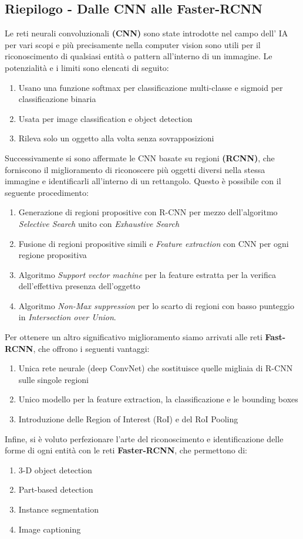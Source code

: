 \subsection*{Riepilogo - Dalle CNN alle Faster-RCNN}
Le reti neurali convoluzionali \textbf{(CNN)} sono state introdotte nel campo dell' IA per vari scopi e più precisamente nella computer vision sono utili per il riconoscimento di qualsiasi entità o pattern all'interno di un immagine. Le potenzialità e i limiti sono elencati di seguito:
\begin{enumerate}
\item Usano una funzione softmax per classificazione multi-classe e sigmoid per classificazione binaria
\item Usata per image classification e object detection
\item Rileva solo un oggetto alla volta senza sovrapposizioni
\end{enumerate}
Successivamente si sono affermate le CNN basate su regioni \textbf{(RCNN)}, che forniscono il miglioramento di riconoscere più oggetti diversi nella stessa immagine e identificarli all'interno di un rettangolo. Questo è possibile con il seguente procedimento:
\begin{enumerate}
\item Generazione di regioni propositive con R-CNN per mezzo dell'algoritmo \emph{Selective Search} unito con \emph{Exhaustive Search}
\item Fusione di regioni propositive simili e \emph{Feature extraction} con CNN per ogni regione propositiva
\item Algoritmo \emph{Support vector machine} per la feature estratta per la verifica dell'effettiva presenza dell'oggetto 
\item Algoritmo \emph{Non-Max suppression} per lo scarto di regioni con basso punteggio in \emph{Intersection over Union}.
\end{enumerate}
Per ottenere un altro significativo miglioramento siamo arrivati alle reti \textbf{Fast-RCNN}, che offrono i seguenti vantaggi:
\begin{enumerate}
\item Unica rete neurale (deep ConvNet) che sostituisce quelle migliaia di R-CNN sulle singole regioni
\item Unico modello per la feature extraction, la classificazione e le bounding boxes
\item Introduzione delle Region of Interest (RoI) e del RoI Pooling
\end{enumerate}
Infine, si è voluto perfezionare l'arte del riconoscimento e identificazione delle forme di ogni entità con le reti \textbf{Faster-RCNN}, che permettono di:
\begin{enumerate}
\item 3-D object detection
\item Part-based detection
\item Instance segmentation
\item Image captioning
\end{enumerate}




